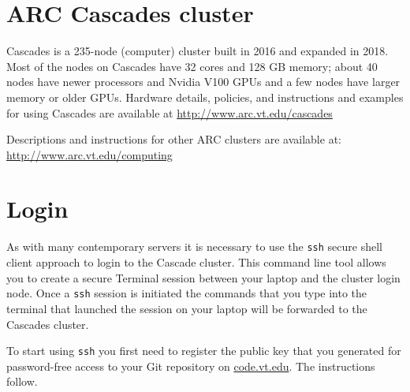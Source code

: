 


\minitoc

\section{ARC Cascades cluster}
Cascades is a 235-node (computer) cluster built in 2016 and expanded in 2018. Most of the nodes on Cascades have 32 cores and 128 GB memory; about 40 nodes have newer processors and Nvidia V100 GPUs and a few nodes have larger memory or older GPUs. Hardware details, policies, and instructions and examples for using Cascades are available at \url{http://www.arc.vt.edu/cascades}

Descriptions and instructions for other ARC clusters are available at: \url{http://www.arc.vt.edu/computing}

\section{Login}

As with many contemporary servers it is necessary to use the \texttt{ssh} secure shell client approach to login to the Cascade cluster. This command line tool allows you to create a secure Terminal session between your laptop and the cluster login node. Once a \texttt{ssh} session is initiated the commands that you type into the terminal that launched the session on your laptop will be forwarded to the Cascades cluster. 

To start using \texttt{ssh} you first need to register the public key that you generated for password-free access to your Git repository on \href{code.vt.edu}{code.vt.edu}. The instructions follow.

